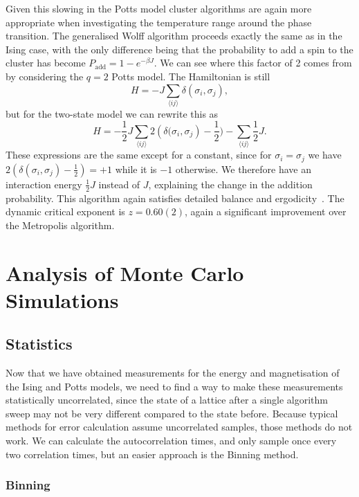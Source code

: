 \documentclass[11pt, a4paper]{report} %
\begin{document}
Given this slowing in the Potts model cluster algorithms are again more appropriate when investigating the temperature range around the phase transition.
The generalised Wolff algorithm proceeds exactly the same as in the Ising case, with the only difference being that the probability to add a spin to the cluster has become \(P_{\mathrm{add}} = 1 - e^{-\beta J}\).
We can see where this factor of 2 comes from by considering the \(q=2\) Potts model.
The Hamiltonian is still
\begin{equation}
	H = -J\sum_{\langle i j \rangle} \delta(\sigma_i, \sigma_j),
\end{equation}
but for the two-state model we can rewrite this as
\begin{equation}
	H = -\frac{1}{2} J \sum_{\langle i j \rangle} 2 \left(\delta(\sigma_i, \sigma_j\right) - \frac{1}{2}) - \sum_{\langle i j \rangle} \frac{1}{2}J.
\end{equation}
These expressions are the same except for a constant, since for \(\sigma_i = \sigma_j\) we have \(2 (\delta(\sigma_i, \sigma_j) - \frac{1}{2}) = +1\) while it is \(-1\) otherwise.
We therefore have an interaction energy \(\frac{1}{2}J\) instead of \(J\), explaining the change in the addition probability.
This algorithm again satisfies detailed balance and ergodicity~\cite{newman:1999}.
The dynamic critical exponent is \(z=0.60(2)\), again a significant improvement over the Metropolis algorithm.


\chapter{Analysis of Monte Carlo Simulations}
\section{Statistics}
Now that we have obtained measurements for the energy and magnetisation of the Ising and Potts models, we need to find a way to make these measurements statistically uncorrelated, since the state of a lattice after a single algorithm sweep may not be very different compared to the state before.
Because typical methods for error calculation assume uncorrelated samples, those methods do not work.
We can calculate the autocorrelation times, and only sample once every two correlation times, but an easier approach is the Binning method.

\subsection{Binning}
\end{document}
